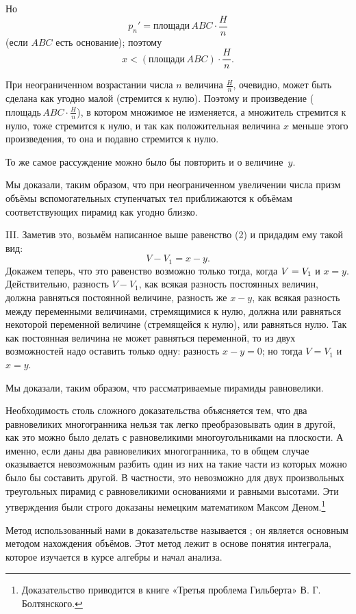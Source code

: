 {Но 
\[p_n'=\text{площади}\, ABC\cdot \frac Hn\]
(если $ABC$ есть основание); поэтому
\[x<(\text{площади}\, ABC)\cdot \frac Hn.\]

При неограниченном возрастании числа $n$ величина $\frac Hn$, очевидно, может быть сделана как угодно малой (стремится к нулю).
Поэтому и произведение ($\text{площадь}\, ABC\cdot \frac Hn$), в котором множимое не изменяется, а множитель стремится к нулю, тоже стремится к нулю, и так как положительная величина $x$ меньше этого произведения, то она и подавно стремится к нулю.

То же самое рассуждение можно было бы повторить и о величине~$y$.

Мы доказали, таким образом, что при неограниченном увеличении числа призм объёмы вспомогательных ступенчатых тел приближаются к объёмам соответствующих пирамид как угодно близко.

III.
Заметив это, возьмём написанное выше равенство (2) и придадим ему такой вид: 
\[V - V_1 = x - y.\]
Докажем теперь, что это равенство возможно только тогда, когда $V\z=V_1$ и $x=y$.
Действительно, разность $V-V_1$, как всякая разность постоянных величин, должна равняться постоянной величине, разность же $x-y$, как всякая разность между переменными величинами, стремящимися к нулю, должна или равняться некоторой переменной величине (стремящейся к нулю), или равняться нулю.
Так как постоянная величина не может равняться переменной, то из двух возможностей надо оставить только одну: разность $x-y=0$;
но тогда $V=V_1$ и $x=y$.

Мы доказали, таким образом, что рассматриваемые пирамиды равновелики.


\medskip

Необходимость столь сложного доказательства объясняется тем, что два равновеликих многогранника нельзя так легко преобразовывать один в другой, как это можно было делать с равновеликими многоугольниками на плоскости.
А именно, если даны два равновеликих многогранника, то в общем случае оказывается невозможным разбить один из них на такие части из которых можно было бы составить другой.
В частности, это невозможно для двух произвольных треугольных пирамид с равновеликими основаниями и равными высотами.
Эти утверждения были строго доказаны немецким математиком Максом Деном.\footnote{Доказательство приводится в книге «Третья проблема Гильберта» В. Г. Болтянского.}

Метод использованный нами в доказательстве называется ; он является основным методом нахождения объёмов.
Этот метод лежит в основе понятия интеграла, которое изучается в курсе алгебры и начал анализа.

}

